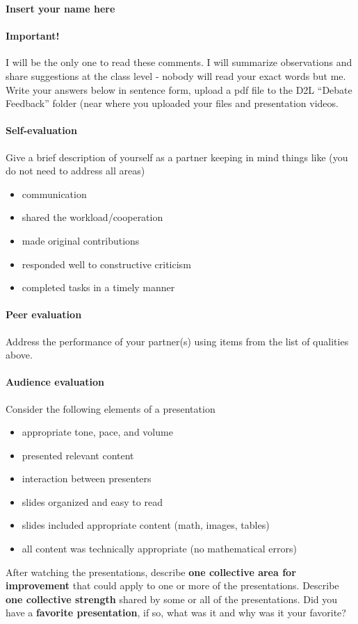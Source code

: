 \documentclass[11pt]{article}
\newcommand{\compactlist}{\setlength{\itemsep}{0pt} \setlength{\parskip}{0pt} \setlength{\leftskip}{-1em}}
\begin{document}
\noindent\textbf{Insert your name here}

\paragraph{Important!} I will be the only one to read these comments. I will summarize observations and share suggestions at the class level - nobody will read your exact words but me.  Write your answers below in sentence form, upload a pdf file to the D2L ``Debate Feedback'' folder (near where you uploaded your files and presentation videos.

\paragraph{Self-evaluation}
Give a brief description of yourself as a partner keeping in mind things like (you do not need to address all areas)
 \begin{itemize}\compactlist
 \item communication
 \item shared the workload/cooperation
 \item made original contributions 
 \item responded well to constructive criticism 
 \item completed tasks in a timely manner 
\end{itemize}


\vfill

\paragraph{Peer evaluation}
Address the performance of your partner(s) using items from the list of qualities above.


\vfill

\paragraph{Audience evaluation}
Consider the following elements of a presentation
\begin{itemize}\compactlist
\item appropriate tone, pace, and volume
\item presented relevant content
\item interaction between presenters
\item slides organized and easy to read
\item slides included appropriate content (math, images, tables)
\item all content was technically appropriate (no mathematical errors)
\end{itemize}
%
After watching the presentations, describe \textbf{one collective area for improvement} that could apply to one or more of the presentations. Describe \textbf{one collective strength} shared by some or all of the presentations.  Did you have a \textbf{favorite presentation}, if so, what was it and why was it your favorite?


\vfill
\end{document}
